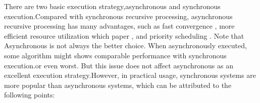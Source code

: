 \begin{comment}
{\color{red}
New interest has recently re-emerged around Datalog for a wide spectrum of knowledge-oriented applications \cite{Aref:2015:DIL:2723372.2742796,7840589,Shkapsky:2013:GQN:2536274.2536290,Alvaro:2010:DDT:2185923.2185942,Shkapsky:2016:BDA:2882903.2915229,Lam:2013:SDE:2510649.2511289,Seo:2013:DSD:2556549.2556572,Wang:2015:AFR:2824032.2824052}%
{\color{red}Datalog is an excellent candidate language for large-scale data analytics because of its high-level declarative semantics and support for recursion. Datalog's support for recursion makes the expression of data analysis natural \cite{}{\color{red}which paper}  and its high-level semantics makes it amenable to parallelization and optimization \cite{}{\color{red}which paper}.

In recent years, many system research efforts have raised to improve performance  and scalability based on Datalog systems. Socialite \cite{Lam:2013:SDE:2510649.2511289,Seo:2013:DSD:2556549.2556572} provides a large scale graph evaluation system supporting both sequential and distribute environment. In Socialite, users can define recursive aggregate functions which, as long as they are meet operations, can be evaluated incrementally and efficiently. The \cite{7113340} project provides a full Datalog language implementation and seeks to provide  system supports that optimizes execution over diverse platforms including sequential implementations \cite{Shkapsky:2016:BDA:2882903.2915229}, multi-core machines, and clusters \cite{Shkapsky:2016:BDA:2882903.2915229}. It supports relational algebra, aggregation, and recursion, as well as a host of declarative optimizations. MyriaX \cite{Halperin:2014:DMB:2588555.2594530} implements a Datalog System on share-nothing engines based on Myria \cite{Halperin:2014:DMB:2588555.2594530}. The computations are incremental, and it support s a variety of iterative models (synchronous, asynchronous, different processing priorities) and failure-handling techniques. It is worth mentioning that MyriaX supports asynchronous processing and shows promising performance for some applications, but it fails to tell in which cases asynchronous processing is suited.
}
\end{comment}
There are two basic execution strategy,asynchronous and synchronous execution.Compared with synchronous recursive processing, asynchronous recursive processing has many advantages, such as fast convergence \cite{maiter}, more efficient resource utilization \cite{}{\color{red}which paper} , and priority scheduling \cite{Zhang:2011:PDF:2038916.2038929}. Note that Asynchronous is not always the better choice. When asynchronously executed, some algorithm might shows comparable performance with synchronous execution.or even worst. But this issue does not affect asynchronous as an excellent execution strategy.However, in practical usage, synchronous systems are more popular than asynchronous systems, which can be attributed to the following points:

